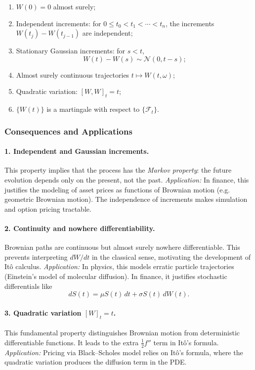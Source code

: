 \documentclass[12pt,a4paper]{book}
\theoremstyle{remark}
\newcommand{\F}{\mathcal{F}}          %
\newcommand{\Normal}{\mathcal{N}}
\begin{document}
\begin{enumerate}[label=\roman*)]
    \item $W(0)=0$ almost surely;
    \item Independent increments: for $0\le t_0 < t_1 < \cdots < t_n$, the increments $W(t_j)-W(t_{j-1})$ are independent;
    \item Stationary Gaussian increments: for $s<t$, 
    \[
    W(t)-W(s) \sim \Normal(0,t-s);
    \]
    \item Almost surely continuous trajectories $t\mapsto W(t,\omega)$;
    \item Quadratic variation: $[W,W]_t = t$;
    \item $\{W(t)\}$ is a martingale with respect to $\{\F_t\}$.
\end{enumerate}

\subsubsection*{Consequences and Applications}

\paragraph{1. Independent and Gaussian increments.}
This property implies that the process has the \emph{Markov property}: the future evolution depends only on the present, not the past.  
\emph{Application:} In finance, this justifies the modeling of asset prices as functions of Brownian motion (e.g. geometric Brownian motion). The independence of increments makes simulation and option pricing tractable.

\paragraph{2. Continuity and nowhere differentiability.}
Brownian paths are continuous but almost surely nowhere differentiable. This prevents interpreting $dW/dt$ in the classical sense, motivating the development of Itô calculus.  
\emph{Application:} In physics, this models erratic particle trajectories (Einstein’s model of molecular diffusion). In finance, it justifies stochastic differentials like
\[
dS(t) = \mu S(t)\,dt + \sigma S(t)\,dW(t).
\]

\paragraph{3. Quadratic variation $[W]_t = t$.}
This fundamental property distinguishes Brownian motion from deterministic differentiable functions. It leads to the extra $\tfrac{1}{2}f''$ term in Itô’s formula.  
\emph{Application:} Pricing via Black–Scholes model relies on Itô’s formula, where the quadratic variation produces the diffusion term in the PDE.
\end{document}
